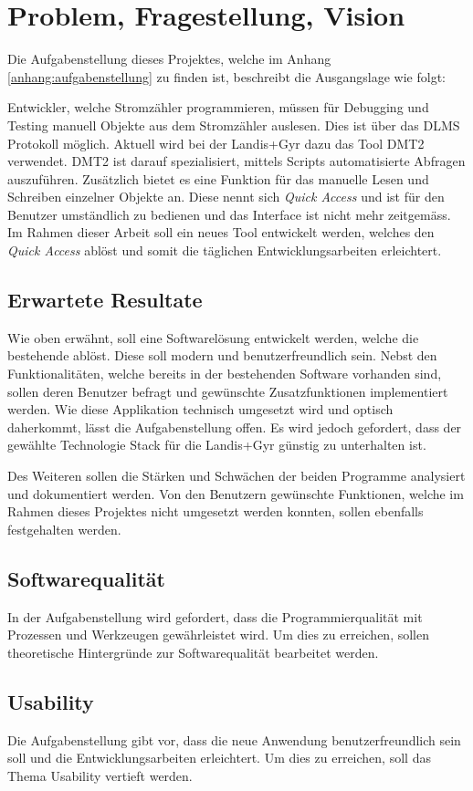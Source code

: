 \chapter{Problem, Fragestellung, Vision}


Die Aufgabenstellung dieses Projektes, welche im Anhang \ref{anhang:aufgabenstellung} zu finden ist, beschreibt die Ausgangslage wie folgt:

\dq Entwickler, welche Stromzähler programmieren, müssen für Debugging und Testing manuell Objekte aus dem Stromzähler auslesen.
Dies ist über das DLMS Protokoll möglich.
Aktuell wird bei der Landis+Gyr dazu das Tool \ac{DMT2} verwendet.
\ac{DMT2} ist darauf spezialisiert, mittels Scripts automatisierte Abfragen auszuführen.
Zusätzlich bietet es eine Funktion für das manuelle Lesen und Schreiben einzelner Objekte an.
Diese nennt sich \textit{Quick Access} und ist für den Benutzer umständlich zu bedienen und das Interface ist nicht mehr zeitgemäss.
Im Rahmen dieser Arbeit soll ein neues Tool entwickelt werden, welches den \textit{Quick Access} ablöst und somit die täglichen Entwicklungsarbeiten erleichtert.\dq

\section{Erwartete Resultate}\label{erwarteteResultate}
Wie oben erwähnt, soll eine Softwarelösung entwickelt werden, welche die bestehende ablöst.
Diese soll modern und benutzerfreundlich sein.
Nebst den Funktionalitäten, welche bereits in der bestehenden Software vorhanden sind, sollen deren Benutzer befragt und gewünschte Zusatzfunktionen implementiert werden.
Wie diese Applikation technisch umgesetzt wird und optisch daherkommt, lässt die Aufgabenstellung offen.
Es wird jedoch gefordert, dass der gewählte Technologie Stack für die Landis+Gyr günstig zu unterhalten ist.

Des Weiteren sollen die Stärken und Schwächen der beiden Programme analysiert und dokumentiert werden.
Von den Benutzern gewünschte Funktionen, welche im Rahmen dieses Projektes nicht umgesetzt werden konnten, sollen ebenfalls festgehalten werden.

\section{Softwarequalität}
In der Aufgabenstellung wird gefordert, dass die Programmierqualität mit Prozessen und Werkzeugen gewährleistet wird.
Um dies zu erreichen, sollen theoretische Hintergründe zur Softwarequalität bearbeitet werden. 

\section{Usability}
Die Aufgabenstellung gibt vor, dass die neue Anwendung benutzerfreundlich sein soll und die Entwicklungsarbeiten erleichtert.
Um dies zu erreichen, soll das Thema Usability vertieft werden.